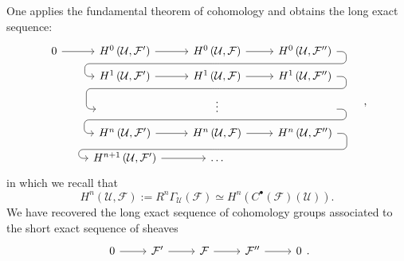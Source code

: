 \documentclass[../Main]{subfiles}
\begin{document}
\begin{rem}[]
	One applies the fundamental theorem of cohomology and obtains the long exact sequence:
	\begin{equation}
		\begin{tikzcd}[row sep=tiny]
			0 \arrow[r, "", rightarrow] &
			H^{0} \left( \mathcal{U}, \mathcal{F}' \right) \arrow[r, "", rightarrow] &
			H^{0} \left( \mathcal{U}, \mathcal{F} \right) \arrow[r, "", rightarrow]
			\arrow[d, phantom, ""{coordinate, name=Z1}] &
			H^{0} \left( \mathcal{U}, \mathcal{F}'' \right)
			\arrow[dll, "", rounded corners, bend left = 100,
			to path={ -- ([xshift=2ex]\tikztostart.east)
				|- (Z1) [near end]\tikztonodes
				-| ([xshift=-2ex]\tikztotarget.west)
				-- (\tikztotarget)}] & \\
			&
			H^{1} \left( \mathcal{U}, \mathcal{F}' \right) \arrow[r, "", rightarrow] &
			H^{1} \left( \mathcal{U}, \mathcal{F} \right) \arrow[r, "", rightarrow]
			\arrow[d, phantom, ""{coordinate, name=Z2}] &
			H^{1} \left( \mathcal{U}, \mathcal{F}'' \right)
			\arrow[dll, "", rounded corners, bend left = 100,
			to path={ -- ([xshift=2ex]\tikztostart.east)
				|- (Z2) [near end]\tikztonodes
				-| ([xshift=-2ex]\tikztotarget.west)
				-- (\tikztotarget)}] & \\
			&
			\phantom{H^{1} \left( \mathcal{U}, \mathcal{F} \right)} &
			\vdots
			\arrow[d, phantom, ""{coordinate, name=Z3}] &
			\phantom{H^{1} \left( \mathcal{U}, \mathcal{F}'' \right)}
			\arrow[dll, "", rounded corners, bend left = 100,
			to path={ -- ([xshift=2ex]\tikztostart.east)
				|- (Z3) [near end]\tikztonodes
				-| ([xshift=-2ex]\tikztotarget.west)
				-- (\tikztotarget)}] & \\
			&
			H^{n} \left( \mathcal{U}, \mathcal{F}' \right) \arrow[r, "", rightarrow] &
			H^{n} \left( \mathcal{U}, \mathcal{F} \right) \arrow[r, "", rightarrow]
			\arrow[d, phantom, ""{coordinate, name=Z4}] &
			H^{n} \left( \mathcal{U}, \mathcal{F}'' \right)
			\arrow[dll, "", rounded corners, bend left = 100,
			to path={ -- ([xshift=2ex]\tikztostart.east)
				|- (Z4) [near end]\tikztonodes
				-| ([xshift=-2ex]\tikztotarget.west)
				-- (\tikztotarget)}] & \\
			&
			H^{n+1} \left( \mathcal{U}, \mathcal{F}' \right) \arrow[r, "", rightarrow] &
			\ldots &
		\end{tikzcd}
		,\end{equation} 
		in which we recall that
		\begin{equation}
			H^{n} \left( \mathcal{U}, \mathcal{F} \right) :=
			R^{n}\Gamma_{\mathcal{U}} \left( \mathcal{F} \right) \simeq
			H^{n} \left( C^\bullet(\mathcal{F})(\mathcal{U}) \right)
		.\end{equation} 
		We have recovered the long exact sequence of cohomology groups associated
		to the short exact sequence of sheaves
		\begin{equation}
		\begin{tikzcd}
			0 \arrow[r, "", rightarrow] &
			\mathcal{F}' \arrow[r, "", rightarrow] &
			\mathcal{F} \arrow[r, "", rightarrow] &
			\mathcal{F}'' \arrow[r, "", rightarrow] &
			0
		\end{tikzcd}
		.\end{equation} 
\end{rem}
\end{document}
